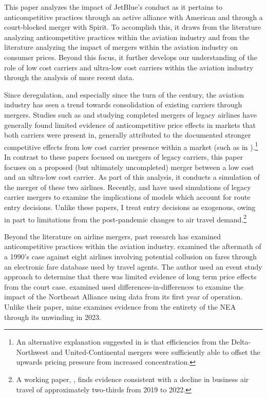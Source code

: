 \documentclass{article}
\begin{document}
	This paper analyzes the impact of JetBlue's conduct as it pertains to anticompetitive practices through an active alliance with American and through a court-blocked merger with Spirit. To accomplish this, it draws from the literature analyzing anticompetitive practices within the aviation industry and from the literature analyzing the impact of mergers within the aviation industry on consumer prices. Beyond this focus, it further develops our understanding of the role of low cost carriers and ultra-low cost carriers within the aviation industry through the analysis of more recent data.
	
	Since deregulation, and especially since the turn of the century, the aviation industry has seen a trend towards consolidation of existing carriers through mergers. Studies such as \citet{luo_price_2014} and \citet{carlton_are_2019} studying completed mergers of legacy airlines have generally found limited evidence of anticompetitive price effects in markets that both carriers were present in, generally attributed to the documented stronger competitive effects from low cost carrier presence within a market (such as in \citet{morrison_actual_2001, goolsbee_how_2008, shrago_spirit_2024}).\footnote{An alternative explanation suggested in \citet{le_market_2019} is that efficiencies from the Delta-Northwest and United-Continental mergers were sufficiently able to offset the upwards pricing pressure from increased concentration.} In contrast to these papers focused on mergers of legacy carriers, this paper focuses on a proposed (but ultimately uncompleted) merger between a low cost and an ultra-low cost carrier. As part of this analysis, it conducts a simulation of the merger of these two airlines. Recently, \citet{ciliberto_market_2021} and \citet{li_repositioning_2022} have used simulations of legacy carrier mergers to examine the implications of models which account for route entry decisions. Unlike these papers, I treat entry decisions as exogenous, owing in part to limitations from the post-pandemic changes to air travel demand.\footnote{A working paper, \citet{ewen_zoom_2023}, finds evidence consistent with a decline in business air travel of approximately two-thirds from 2019 to 2022.} 
	
	Beyond the literature on airline mergers, past research has examined anticompetitive practices within the aviation industry. \citet{miller_did_2010} examined the aftermath of a 1990's case against eight airlines involving potential collusion on fares through an electronic fare database used by travel agents. The author used an event study approach to determine that there was limited evidence of long term price effects from the court case. \citet{zou_assessing_2023} examined used differences-in-differences to examine the impact of the Northeast Alliance using data from its first year of operation. Unlike their paper, mine examines evidence from the entirety of the NEA through its unwinding in 2023. 
	
\end{document}
